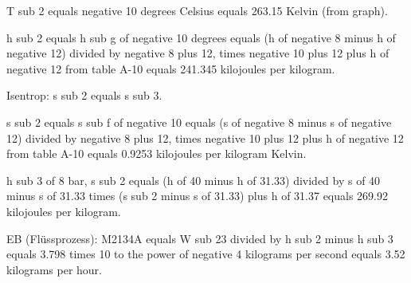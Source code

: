 T sub 2 equals negative 10 degrees Celsius equals 263.15 Kelvin (from graph).

h sub 2 equals h sub g of negative 10 degrees equals (h of negative 8 minus h of negative 12) divided by negative 8 plus 12, times negative 10 plus 12 plus h of negative 12 from table A-10 equals 241.345 kilojoules per kilogram.

Isentrop: s sub 2 equals s sub 3.

s sub 2 equals s sub f of negative 10 equals (s of negative 8 minus s of negative 12) divided by negative 8 plus 12, times negative 10 plus 12 plus h of negative 12 from table A-10 equals 0.9253 kilojoules per kilogram Kelvin.

h sub 3 of 8 bar, s sub 2 equals (h of 40 minus h of 31.33) divided by s of 40 minus s of 31.33 times (s sub 2 minus s of 31.33) plus h of 31.37 equals 269.92 kilojoules per kilogram.

EB (Flüssprozess): M2134A equals W sub 23 divided by h sub 2 minus h sub 3 equals 3.798 times 10 to the power of negative 4 kilograms per second equals 3.52 kilograms per hour.